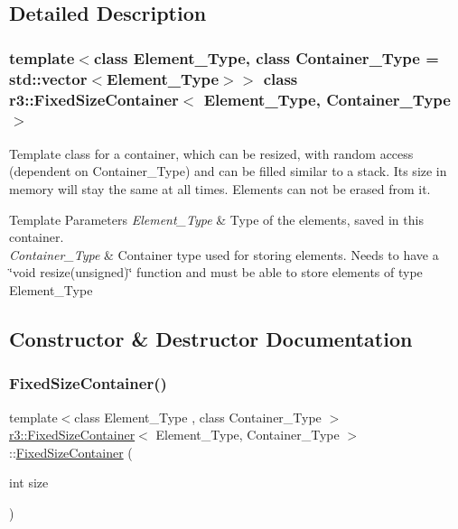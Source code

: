 \subsection{Detailed Description}
\subsubsection*{template$<$class Element\+\_\+\+Type, class Container\+\_\+\+Type = std\+::vector$<$\+Element\+\_\+\+Type$>$$>$\newline
class r3\+::\+Fixed\+Size\+Container$<$ Element\+\_\+\+Type, Container\+\_\+\+Type $>$}

Template class for a container, which can be resized, with random access (dependent on Container\+\_\+\+Type) and can be filled similar to a stack. Its size in memory will stay the same at all times. Elements can not be erased from it. 


\begin{DoxyTemplParams}{Template Parameters}
{\em Element\+\_\+\+Type} & Type of the elements, saved in this container. \\
\hline
{\em Container\+\_\+\+Type} & Container type used for storing elements. Needs to have a \char`\"{}void resize(unsigned)\char`\"{} function and must be able to store elements of type Element\+\_\+\+Type \\
\hline
\end{DoxyTemplParams}


\subsection{Constructor \& Destructor Documentation}
\mbox{\label{classr3_1_1_fixed_size_container_a9396266faf0a5d5d75ea50f0d74d5267}} 
\subsubsection{\texorpdfstring{Fixed\+Size\+Container()}{FixedSizeContainer()}}
{\footnotesize\ttfamily template$<$class Element\+\_\+\+Type , class Container\+\_\+\+Type $>$ \\
\mbox{\hyperlink{classr3_1_1_fixed_size_container}{r3\+::\+Fixed\+Size\+Container}}$<$ Element\+\_\+\+Type, Container\+\_\+\+Type $>$\+::\mbox{\hyperlink{classr3_1_1_fixed_size_container}{Fixed\+Size\+Container}} (\begin{DoxyParamCaption}\item[{int}]{size }\end{DoxyParamCaption})\hspace{0.3cm}{\ttfamily [explicit]}}



